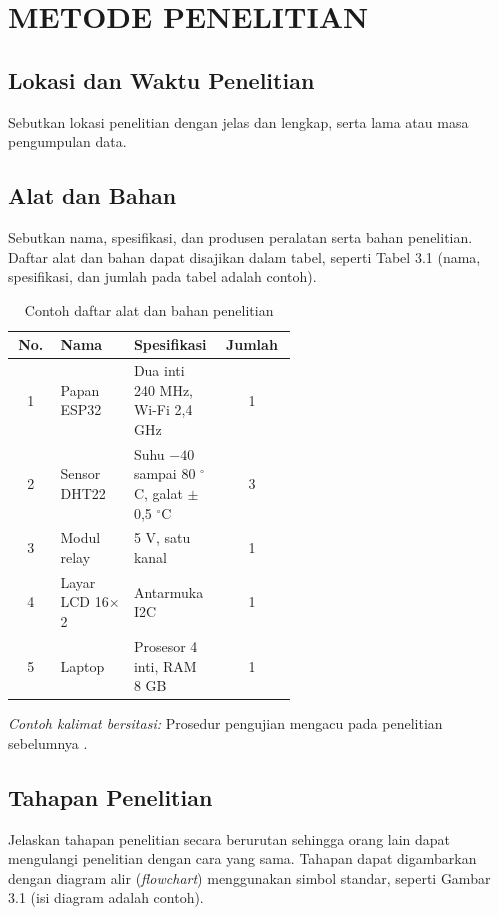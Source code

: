 \chapter{METODE PENELITIAN}

\section{Lokasi dan Waktu Penelitian}
Sebutkan lokasi penelitian dengan jelas dan lengkap, serta lama atau masa pengumpulan data.

\section{Alat dan Bahan}
Sebutkan nama, spesifikasi, dan produsen peralatan serta bahan penelitian. Daftar alat dan bahan dapat disajikan dalam tabel, seperti Tabel 3.1 (nama, spesifikasi, dan jumlah pada tabel adalah contoh).

\begin{singlespace}
\begin{longtable}{|c|p{0.26\linewidth}|p{0.30\linewidth}|c|}
\caption{Contoh daftar alat dan bahan penelitian}\\
\hline
\textbf{No.} & \textbf{Nama} & \textbf{Spesifikasi} & \textbf{Jumlah} \\
\hline
1 & Papan ESP32 & Dua inti 240 MHz, Wi-Fi 2,4 GHz & 1 \\
\hline
2 & Sensor DHT22 & Suhu $-40$ sampai 80 $^\circ$C, galat $\pm$0,5 $^\circ$C & 3 \\
\hline
3 & Modul relay & 5 V, satu kanal & 1 \\
\hline
4 & Layar LCD 16$\times$2 & Antarmuka I2C & 1 \\
\hline
5 & Laptop & Prosesor 4 inti, RAM 8 GB & 1 \\
\hline
\end{longtable}
\end{singlespace}

\textit{Contoh kalimat bersitasi:} Prosedur pengujian mengacu pada penelitian sebelumnya \parencite{alqahtani2013}.

\section{Tahapan Penelitian}
Jelaskan tahapan penelitian secara berurutan sehingga orang lain dapat mengulangi penelitian dengan cara yang sama. Tahapan dapat digambarkan dengan diagram alir (\textit{flowchart}) menggunakan simbol standar, seperti Gambar 3.1 (isi diagram adalah contoh).

